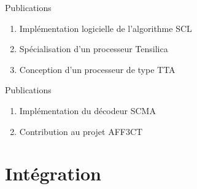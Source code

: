 \documentclass[t,compress,mathserif,12pt,xcolor=dvipsnames]{beamer}
\begin{document}
\begin{frame}[c]{Publications}

  \begin{enumerate}
\renewcommand{\section}[2]{} %

    \renewcommand*{\bibfont}{\scriptsize}
    \nocite{leonardon_fast_2017,leonardon_custom_2018,ghaffari_improving_2017,leonardon_tta_2018,Ghaffari2018,cassagne_fast_2017,cassagne_gdr_2017,leonardon_custom_2018}
    \vfill
    \item<+-> Implémentation logicielle de l'algorithme  SCL
    \scriptsize{\printbibliography[keyword={fast-scl}]}
    \vfill
    \item<+-> Spécialisation d'un processeur Tensilica
    \scriptsize{\printbibliography[keyword={tensilica}]}
    \vfill
    \item<+-> Conception d'un processeur de type TTA
    \scriptsize{\printbibliography[keyword={tta}]}
    \vfill
  \end{enumerate}

\end{frame}

\begin{frame}[c]{Publications}

  \begin{enumerate}
\renewcommand{\section}[2]{} %

    \renewcommand*{\bibfont}{\scriptsize}
    \nocite{leonardon_fast_2017,leonardon_custom_2018,ghaffari_improving_2017,leonardon_tta_2018,Ghaffari2018,cassagne_fast_2017,cassagne_gdr_2017}
    \vfill
    \item<+-> Implémentation du décodeur SCMA
    \printbibliography[keyword={ghaffari}]
    \vfill
    \item<+-> Contribution au projet AFF3CT
    \printbibliography[keyword={aff3ct}]
    \vfill
  \end{enumerate}

\end{frame}




\section{Intégration}
\end{document}
